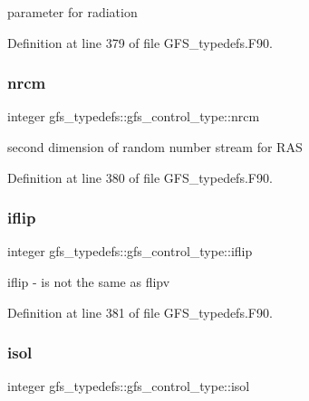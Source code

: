 parameter for radiation 



Definition at line 379 of file G\+F\+S\+\_\+typedefs.\+F90.

\mbox{\label{structgfs__typedefs_1_1gfs__control__type_aa28a880915ebf1d7be46fd35fad3e4ee}} 
\subsubsection{nrcm}
{\footnotesize\ttfamily integer gfs\+\_\+typedefs\+::gfs\+\_\+control\+\_\+type\+::nrcm}



second dimension of random number stream for R\+AS 



Definition at line 380 of file G\+F\+S\+\_\+typedefs.\+F90.

\mbox{\label{structgfs__typedefs_1_1gfs__control__type_a0cc7e1c7072684282ee95394a9e44682}} 
\subsubsection{iflip}
{\footnotesize\ttfamily integer gfs\+\_\+typedefs\+::gfs\+\_\+control\+\_\+type\+::iflip}



iflip -\/ is not the same as flipv 



Definition at line 381 of file G\+F\+S\+\_\+typedefs.\+F90.

\mbox{\label{structgfs__typedefs_1_1gfs__control__type_a8c7751f938eefc1c17f088b4ee68215e}} 
\subsubsection{isol}
{\footnotesize\ttfamily integer gfs\+\_\+typedefs\+::gfs\+\_\+control\+\_\+type\+::isol}



